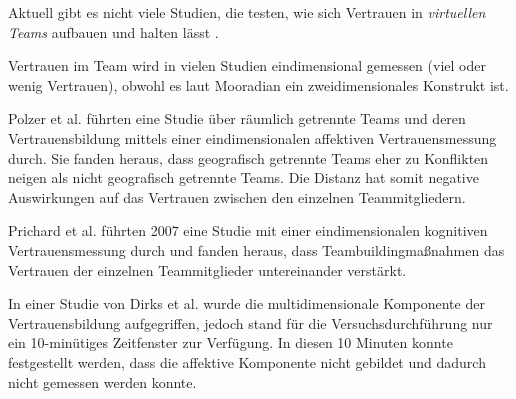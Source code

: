 \documentclass[a4paper,11pt]{article}%
\renewcommand{\\}{\vspace*{0.5\baselineskip} \newline}
\begin{document}
{Aktuell gibt es nicht viele Studien, die testen, wie sich Vertrauen in \textit{virtuellen Teams} aufbauen und halten lässt \citep[S. 8-23]{duarte2006mastering}.

Vertrauen im Team wird in vielen Studien eindimensional gemessen (viel oder wenig Vertrauen), obwohl es laut Mooradian \citep[S. 524-525]{mooradian2006trusts} ein zweidimensionales Konstrukt ist.

Polzer et al. \citep[S. 682]{polzer2006extending} führten eine Studie über räumlich getrennte Teams und deren Vertrauensbildung mittels einer eindimensionalen affektiven Vertrauensmessung durch. Sie fanden heraus, dass geografisch getrennte Teams eher zu Konflikten neigen als nicht geografisch getrennte Teams. Die Distanz hat somit negative Auswirkungen auf das Vertrauen zwischen den einzelnen Teammitgliedern.

Prichard et al. \citep[S. 704]{prichard2007effects} führten 2007 eine Studie mit einer eindimensionalen kognitiven Vertrauensmessung durch und fanden heraus, dass Teambuildingmaßnahmen das Vertrauen der einzelnen Teammitglieder untereinander verstärkt.

In einer Studie von Dirks et al. \citep{dirks1999effects} wurde die multidimensionale Komponente der Vertrauensbildung aufgegriffen, jedoch stand für die Versuchsdurchführung nur ein 10-minütiges Zeitfenster zur Verfügung. In diesen 10 Minuten konnte festgestellt werden, dass die affektive Komponente nicht gebildet und dadurch nicht gemessen werden konnte. 



\newpage

}
\end{document}
